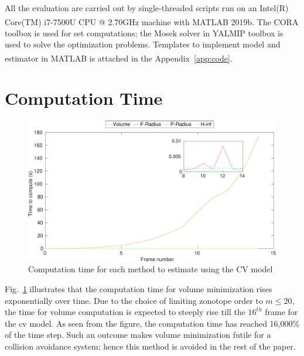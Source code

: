 All the evaluation are carried out by single-threaded scripts run on an Intel(R) Core(TM) i7-7500U CPU @ 2.70GHz machine with MATLAB\textsuperscript{\tiny\textregistered} 2019b. The CORA toolbox is used for set computations; the Mosek solver in YALMIP toolbox is used to solve the optimization problems. Templates to implement model and estimator in MATLAB\textsuperscript{\tiny\textregistered} is attached in the Appendix~\ref{app:code}.

\section{Computation Time}
\begin{figure}[H]
\centering
\includegraphics[width=\linewidth]{figures/timegraphh}
\caption{Computation time for each method to estimate using the CV model}
\label{fig:timegraph}
\end{figure}
Fig.~\ref{fig:timegraph} illustrates that the computation time for volume minimization rises exponentially over time. Due to the choice of limiting zonotope order to $m\leq20$, the time for volume computation is expected to steeply rise till the $16^{th}$ frame for the cv model. As seen from the figure, the computation time has reached 16,000\% of the time step. Such an outcome makes volume minimization futile for a collision avoidance system; hence this method is avoided in the rest of the paper.

